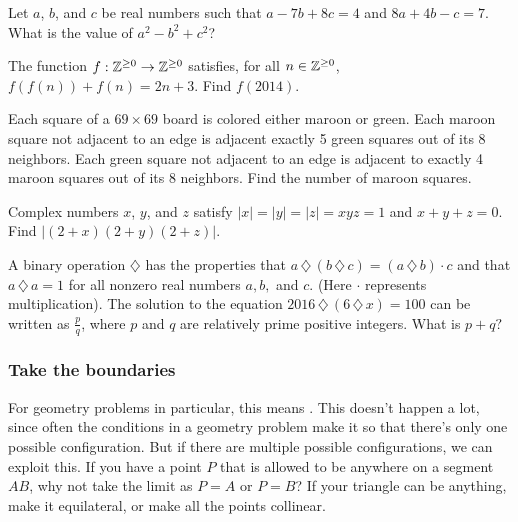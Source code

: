 \documentclass[11pt,paper=letter]{scrartcl}
\begin{document}
\begin{mdframed}[style=exmdbox]

\begin{problem}[AMC 10B 2002/20]
  Let $a$, $b$, and $c$ be real numbers such that $a-7b+8c=4$ and $8a+4b-c=7$. What is the value of $a^2-b^2+c^2$?
\end{problem}

\begin{problem}
  The function $f : \mathbb Z^{\geq 0} \to \mathbb Z^{\geq 0}$ satisfies, for all $n \in \mathbb Z^{\geq 0}$, $f(f(n)) + f(n) = 2n + 3$. Find $f(2014)$.
\end{problem}

\begin{problem}
  Each square of a $69 \times 69$ board is colored either maroon or green. Each maroon square not adjacent to an edge is adjacent exactly 5 green squares out of its 8 neighbors. Each green square not adjacent to an edge is adjacent to exactly 4 maroon squares out of its 8 neighbors. Find the number of maroon squares.
\end{problem}

\begin{problem}
  Complex numbers $x$, $y$, and $z$ satisfy $|x| = |y| = |z| = xyz = 1$ and $x + y + z = 0$. Find $|(2 + x)(2+y)(2+ z)|$. \hint{\ref{h:8}}
\end{problem}

\begin{problem}[AMC 10A 2016/23]
  A binary operation $\diamondsuit$ has the properties that $a\,\diamondsuit\, (b\,\diamondsuit \,c) = (a\,\diamondsuit \,b)\cdot c$ and that $a\,\diamondsuit \,a=1$ for all nonzero real numbers $a, b,$ and $c$. (Here $\cdot$ represents multiplication). The solution to the equation $2016 \,\diamondsuit\, (6\,\diamondsuit\, x)=100$ can be written as $\tfrac{p}{q}$, where $p$ and $q$ are relatively prime positive integers. What is $p+q?$
\end{problem}

\end{mdframed}

\subsubsection{Take the boundaries}

For geometry problems in particular, this means . This doesn't happen a lot, since often the conditions in a geometry problem make it so that there's only one possible configuration. But if there are multiple possible configurations, we can exploit this. If you have a point $P$ that is allowed to be anywhere on a segment $AB$, why not take the limit as $P = A$ or $P = B$? If your triangle can be anything, make it equilateral, or make all the points collinear.
\end{document}
